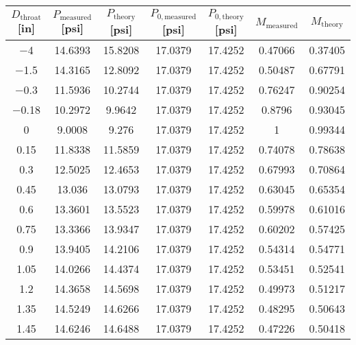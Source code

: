 \begin{tabular}{ccccccc}
\toprule
$D_\text{throat}$ [\unit{in}] & $P_\text{measured}$ [\unit{psi}] & $P_\text{theory}$ [\unit{psi}] & $P_{0,\text{measured}}$ [\unit{psi}] & $P_{0,\text{theory}}$ [\unit{psi}] & $M_\text{measured}$ & $M_\text{theory}$ \\
\midrule
\num{-4} & \num{14.6393} & \num{15.8208} & \num{17.0379} & \num{17.4252} & \num{0.47066} & \num{0.37405} \\ 
\num{-1.5} & \num{14.3165} & \num{12.8092} & \num{17.0379} & \num{17.4252} & \num{0.50487} & \num{0.67791} \\ 
\num{-0.3} & \num{11.5936} & \num{10.2744} & \num{17.0379} & \num{17.4252} & \num{0.76247} & \num{0.90254} \\ 
\num{-0.18} & \num{10.2972} & \num{9.9642} & \num{17.0379} & \num{17.4252} & \num{0.8796} & \num{0.93045} \\ 
\num{0} & \num{9.0008} & \num{9.276} & \num{17.0379} & \num{17.4252} & \num{1} & \num{0.99344} \\ 
\num{0.15} & \num{11.8338} & \num{11.5859} & \num{17.0379} & \num{17.4252} & \num{0.74078} & \num{0.78638} \\ 
\num{0.3} & \num{12.5025} & \num{12.4653} & \num{17.0379} & \num{17.4252} & \num{0.67993} & \num{0.70864} \\ 
\num{0.45} & \num{13.036} & \num{13.0793} & \num{17.0379} & \num{17.4252} & \num{0.63045} & \num{0.65354} \\ 
\num{0.6} & \num{13.3601} & \num{13.5523} & \num{17.0379} & \num{17.4252} & \num{0.59978} & \num{0.61016} \\ 
\num{0.75} & \num{13.3366} & \num{13.9347} & \num{17.0379} & \num{17.4252} & \num{0.60202} & \num{0.57425} \\ 
\num{0.9} & \num{13.9405} & \num{14.2106} & \num{17.0379} & \num{17.4252} & \num{0.54314} & \num{0.54771} \\ 
\num{1.05} & \num{14.0266} & \num{14.4374} & \num{17.0379} & \num{17.4252} & \num{0.53451} & \num{0.52541} \\ 
\num{1.2} & \num{14.3658} & \num{14.5698} & \num{17.0379} & \num{17.4252} & \num{0.49973} & \num{0.51217} \\ 
\num{1.35} & \num{14.5249} & \num{14.6266} & \num{17.0379} & \num{17.4252} & \num{0.48295} & \num{0.50643} \\ 
\num{1.45} & \num{14.6246} & \num{14.6488} & \num{17.0379} & \num{17.4252} & \num{0.47226} & \num{0.50418} \\ 
\bottomrule
\end{tabular}
